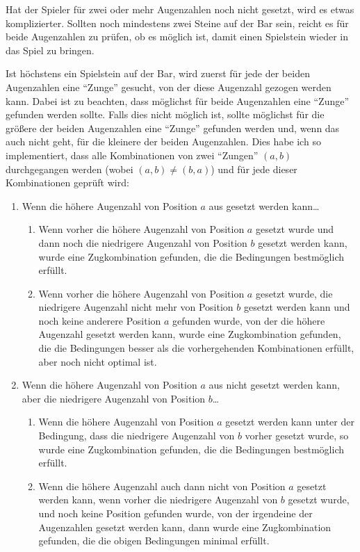 Hat der Spieler für zwei oder mehr Augenzahlen noch nicht gesetzt, wird es etwas komplizierter. Sollten noch mindestens zwei Steine auf der Bar sein, reicht es für beide Augenzahlen zu prüfen, ob es möglich ist, damit einen Spielstein wieder in das Spiel zu bringen.

Ist höchstens ein Spielstein auf der Bar, wird zuerst für jede der beiden Augenzahlen eine "`Zunge"' gesucht, von der diese Augenzahl gezogen werden kann. Dabei ist zu beachten, dass möglichst für beide Augenzahlen eine "`Zunge"' gefunden werden sollte. Falls dies nicht möglich ist, sollte möglichst für die größere der beiden Augenzahlen eine "`Zunge"' gefunden werden und, wenn das auch nicht geht, für die kleinere der beiden Augenzahlen. Dies habe ich so implementiert, dass alle Kombinationen von zwei "`Zungen"' $(a, b)$ durchgegangen werden (wobei $(a, b) \neq (b, a)$) und für jede dieser Kombinationen geprüft wird:
\begin{enumerate}
  \item Wenn die höhere Augenzahl von Position $a$ aus gesetzt werden kann\dots
    \begin{enumerate}[\theenumi.1.]
      \item Wenn vorher die höhere Augenzahl von Position $a$ gesetzt wurde und dann noch die niedrigere Augenzahl von Position $b$ gesetzt werden kann, wurde eine Zugkombination gefunden, die die Bedingungen bestmöglich erfüllt.
      \item Wenn vorher die höhere Augenzahl von Position $a$ gesetzt wurde, die niedrigere Augenzahl nicht mehr von Position $b$ gesetzt werden kann und noch keine anderere Position $a$ gefunden wurde, von der die höhere Augenzahl gesetzt werden kann, wurde eine Zugkombination gefunden, die die Bedingungen besser als die vorhergehenden Kombinationen erfüllt, aber noch nicht optimal ist.
    \end{enumerate}
  \item Wenn die höhere Augenzahl von Position $a$ aus nicht gesetzt werden kann, aber die niedrigere Augenzahl von Position $b$\dots
    \begin{enumerate}[\theenumi.1.]
      \item Wenn die höhere Augenzahl von Position $a$ gesetzt werden kann unter der Bedingung, dass die niedrigere Augenzahl von $b$ vorher gesetzt wurde, so wurde eine Zugkombination gefunden, die die Bedingungen bestmöglich erfüllt.
      \item Wenn die höhere Augenzahl auch dann nicht von Position $a$ gesetzt werden kann, wenn vorher die niedrigere Augenzahl von $b$ gesetzt wurde, und noch keine Position gefunden wurde, von der irgendeine der Augenzahlen gesetzt werden kann, dann wurde eine Zugkombination gefunden, die die obigen Bedingungen minimal erfüllt.
    \end{enumerate}
\end{enumerate}

